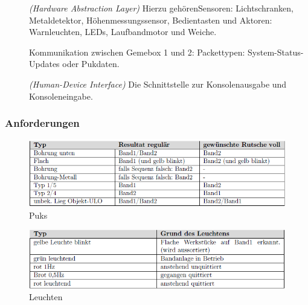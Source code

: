 \documentclass[
   draft=false
  ,paper=a4
  ,twoside=true
  ,fontsize=11pt
  ,headsepline
  ,DIV11
  ,parskip=full+
]{scrartcl} %
\begin{document}
\begin{description}
\item[] 
\emph{(Hardware Abstraction Layer)} Hierzu gehören\newline Sensoren: Lichtschranken, Metaldetektor, Höhenmessungssensor, Bedientasten \newline und Aktoren: Warnleuchten, LEDs, Laufbandmotor und Weiche.
\item[] Kommunikation zwischen Gemebox 1 und 2: \newline Packettypen: System-Status-Updates oder Pukdaten.
\item[]\emph{(Human-Device Interface)} Die Schnittstelle zur Konsolenausgabe und Konsoleneingabe.

\end{description}


\subsubsection{Anforderungen}

\begin{figure}[H]
	\centering
	\includegraphics[width=1.0\linewidth]{./IMG/Puks}
	\caption{Puks}
	\label{fig:Puks}
\end{figure}

\begin{figure}[H]
	\centering
	\includegraphics[width=1.0\linewidth]{./IMG/Leuchten}
	\caption{Leuchten}
	\label{fig:Leuchten}
\end{figure}

\end{document}
